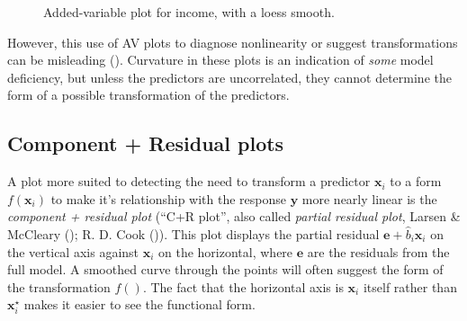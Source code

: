 \documentclass[
  letterpaper,
  10pt,
  krantz2]{krantz}
\begin{document}
\begin{figure}[H]


\caption{\label{fig-prestige-av-income}Added-variable plot for income,
with a loess smooth.}

\end{figure}%

However, this use of AV plots to diagnose nonlinearity or suggest
transformations can be misleading (). Curvature in these plots is an indication of \emph{some} model
deficiency, but unless the predictors are uncorrelated, they cannot
determine the form of a possible transformation of the predictors.

\subsection{Component + Residual plots}\label{component-residual-plots}

A plot more suited to detecting the need to transform a predictor
\(\mathbf{x}_i\) to a form \(f(\mathbf{x}_i)\) to make it's relationship
with the response \(\mathbf{y}\) more nearly linear is the
\emph{component + residual plot} (``C+R plot'', also called
\emph{partial residual plot}, Larsen \& McCleary
(); R. D. Cook
()). This plot displays the partial residual
\(\mathbf{e} + \hat{b}_i \mathbf{x}_i\) on the vertical axis against
\(\mathbf{x}_i\) on the horizontal, where \(\mathbf{e}\) are the
residuals from the full model. A smoothed curve through the points will
often suggest the form of the transformation \(f()\). The fact that the
horizontal axis is \(\mathbf{x}_i\) itself rather than
\(\mathbf{x}^\star_i\) makes it easier to see the functional form.
\end{document}
